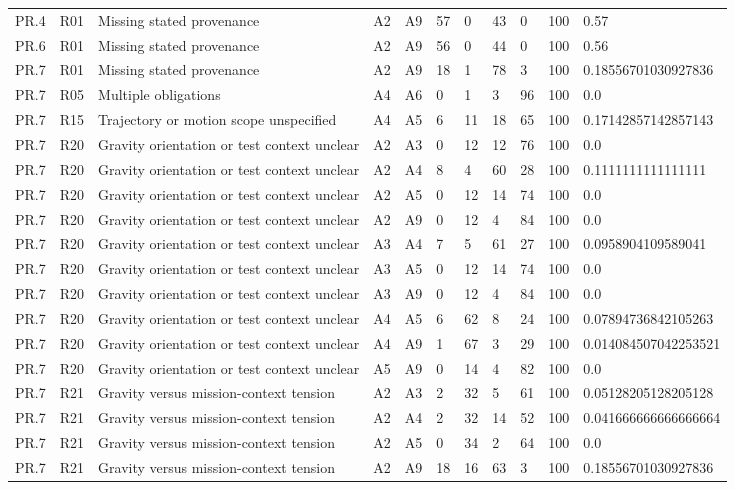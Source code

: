 \begin{tabular}{lllllllllll}
PR.4 & R01 & Missing stated provenance & A2 & A9 & 57 & 0 & 43 & 0 & 100 & 0.57 \\
PR.6 & R01 & Missing stated provenance & A2 & A9 & 56 & 0 & 44 & 0 & 100 & 0.56 \\
PR.7 & R01 & Missing stated provenance & A2 & A9 & 18 & 1 & 78 & 3 & 100 & 0.18556701030927836 \\
PR.7 & R05 & Multiple obligations & A4 & A6 & 0 & 1 & 3 & 96 & 100 & 0.0 \\
PR.7 & R15 & Trajectory or motion scope unspecified & A4 & A5 & 6 & 11 & 18 & 65 & 100 & 0.17142857142857143 \\
PR.7 & R20 & Gravity orientation or test context unclear & A2 & A3 & 0 & 12 & 12 & 76 & 100 & 0.0 \\
PR.7 & R20 & Gravity orientation or test context unclear & A2 & A4 & 8 & 4 & 60 & 28 & 100 & 0.1111111111111111 \\
PR.7 & R20 & Gravity orientation or test context unclear & A2 & A5 & 0 & 12 & 14 & 74 & 100 & 0.0 \\
PR.7 & R20 & Gravity orientation or test context unclear & A2 & A9 & 0 & 12 & 4 & 84 & 100 & 0.0 \\
PR.7 & R20 & Gravity orientation or test context unclear & A3 & A4 & 7 & 5 & 61 & 27 & 100 & 0.0958904109589041 \\
PR.7 & R20 & Gravity orientation or test context unclear & A3 & A5 & 0 & 12 & 14 & 74 & 100 & 0.0 \\
PR.7 & R20 & Gravity orientation or test context unclear & A3 & A9 & 0 & 12 & 4 & 84 & 100 & 0.0 \\
PR.7 & R20 & Gravity orientation or test context unclear & A4 & A5 & 6 & 62 & 8 & 24 & 100 & 0.07894736842105263 \\
PR.7 & R20 & Gravity orientation or test context unclear & A4 & A9 & 1 & 67 & 3 & 29 & 100 & 0.014084507042253521 \\
PR.7 & R20 & Gravity orientation or test context unclear & A5 & A9 & 0 & 14 & 4 & 82 & 100 & 0.0 \\
PR.7 & R21 & Gravity versus mission-context tension & A2 & A3 & 2 & 32 & 5 & 61 & 100 & 0.05128205128205128 \\
PR.7 & R21 & Gravity versus mission-context tension & A2 & A4 & 2 & 32 & 14 & 52 & 100 & 0.041666666666666664 \\
PR.7 & R21 & Gravity versus mission-context tension & A2 & A5 & 0 & 34 & 2 & 64 & 100 & 0.0 \\
PR.7 & R21 & Gravity versus mission-context tension & A2 & A9 & 18 & 16 & 63 & 3 & 100 & 0.18556701030927836 \\

\end{tabular}

